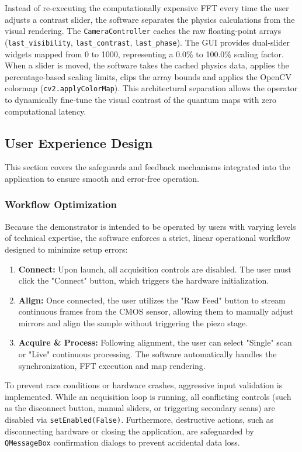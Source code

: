 \documentclass[12pt,a4paper]{article}
\begin{document}
        Instead of re-executing the computationally expensive \ac{FFT} every time the user adjusts a contrast slider, the software separates the physics calculations from the visual rendering. The \texttt{CameraController} caches the raw floating-point arrays (\texttt{last\_visibility}, \texttt{last\_contrast}, \texttt{last\_phase}). The \ac{GUI} provides dual-slider widgets mapped from 0 to 1000, representing a 0.0\% to 100.0\% scaling factor. When a slider is moved, the software takes the cached physics data, applies the percentage-based scaling limits, clips the array bounds and applies the OpenCV colormap (\texttt{cv2.applyColorMap}). This architectural separation allows the operator to dynamically fine-tune the visual contrast of the quantum maps with zero computational latency.

    \subsection{User Experience Design}
    This section covers the safeguards and feedback mechanisms integrated into the application to ensure smooth and error-free operation.

        \subsubsection{Workflow Optimization}
        Because the demonstrator is intended to be operated by users with varying levels of technical expertise, the software enforces a strict, linear operational workflow designed to minimize setup errors:
        \begin{enumerate}
            \item \textbf{Connect:} Upon launch, all acquisition controls are disabled. The user must click the "Connect" button, which triggers the hardware initialization.
            \item \textbf{Align:} Once connected, the user utilizes the "Raw Feed" button to stream continuous frames from the \ac{CMOS} sensor, allowing them to manually adjust mirrors and align the sample without triggering the piezo stage.
            \item \textbf{Acquire \& Process:} Following alignment, the user can select "Single" scan or "Live" continuous processing. The software automatically handles the synchronization, \ac{FFT} execution and map rendering.
        \end{enumerate}

        To prevent race conditions or hardware crashes, aggressive input validation is implemented. While an acquisition loop is running, all conflicting controls (such as the disconnect button, manual sliders, or triggering secondary scans) are disabled via \texttt{setEnabled(False)}. Furthermore, destructive actions, such as disconnecting hardware or closing the application, are safeguarded by \texttt{QMessageBox} confirmation dialogs to prevent accidental data loss.
\end{document}
